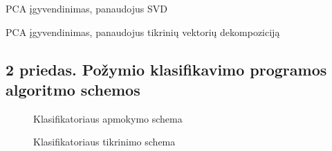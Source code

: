 \documentclass[]{vgtuef}
\begin{document}
\begin{cfigure}[!h]
  \centering
  \caption{PCA įgyvendinimas, panaudojus SVD}
  \label{code:pca_svd}
  
\end{cfigure}

\begin{cfigure}[H]
  \centering
  \caption{PCA įgyvendinimas, panaudojus tikrinių vektorių dekompoziciją}
  \label{code:pca_eig}
  
\end{cfigure}

\subsection*{2 priedas. Požymio klasifikavimo programos algoritmo schemos}
\label{subsec:class_stuff}

\begin{figure}[H]
  \centering
  
  \caption{Klasifikatoriaus apmokymo schema}
  \label{fig:class_train}
\end{figure}

\begin{figure}[H]
  \centering
  
  \caption{Klasifikatoriaus tikrinimo schema}
  \label{fig:class_test}
\end{figure}
\end{document}
